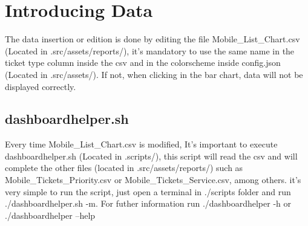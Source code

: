 \documentclass[12pt]{article}
\begin{document}

\section{Introducing Data} %
The data insertion or edition is done by editing the file Mobile\_List\_Chart.csv (Located in .src/assets/reports/), it's mandatory to use the same name in the ticket type column 
inside the csv and in the colorscheme inside config.json (Located in .src/assets/). If not, when clicking in the bar chart, data will not be displayed correctly.\par
\subsection{dashboardhelper.sh}
Every time Mobile\_List\_Chart.csv is modified, It's important to execute dashboardhelper.sh (Located in .scripts/), this script will read the csv and will complete the other files (located in .src/assets/reports/)
such as Mobile\_Tickets\_Priority.csv or Mobile\_Tickets\_Service.csv, among others. it's very simple to run the script, just open a terminal in ./scripts folder and run ./dashboardhelper.sh -m.
For futher information run ./dashboardhelper -h or ./dashboardhelper --help\par
\end{document}
